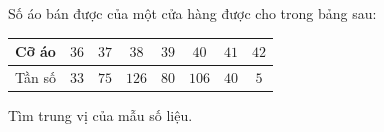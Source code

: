 \begin{ex}
Số áo bán được của một cửa hàng được cho trong bảng sau:
\begin{center}
\begin{tabular}{|c|c|c|c|c|c|c|c|}\hline
Cỡ áo & $36$ & $37$ & $38$ & $39$ & $40$ & $41$ & $42$\\\hline
Tần số & $33$ & $75$ & $126$ & $80$ & $106$ & $40$ & $5$\\\hline
\end{tabular}
\end{center}
Tìm trung vị của mẫu số liệu.
\end{ex}
